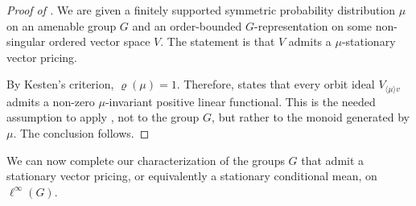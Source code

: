 \documentclass[11pt]{amsart}
\numberwithin{equation}{section}
\theoremstyle{definition}
\theoremstyle{definition}
\begin{document}
\begin{proof}[Proof of ]
We are given a finitely supported symmetric probability distribution $\mu$ on an amenable group $G$ and an order-bounded $G$-representation on some non-singular ordered vector space $V$. The statement is that $V$ admits a $\mu$-stationary vector pricing.

By Kesten's criterion,  $\varrho(\mu)=1$. Therefore,  states that every orbit ideal $V_{\langle \mu \rangle v}$ admits a non-zero $\mu$-invariant positive linear functional. This is the needed assumption to apply , not to the group $G$, but rather to the monoid generated by $\mu$. The conclusion follows.
\end{proof}

We can now complete our characterization of the groups $G$ that admit a stationary vector pricing, or equivalently a stationary conditional mean, on $\ell^\infty(G)$.
\end{document}
